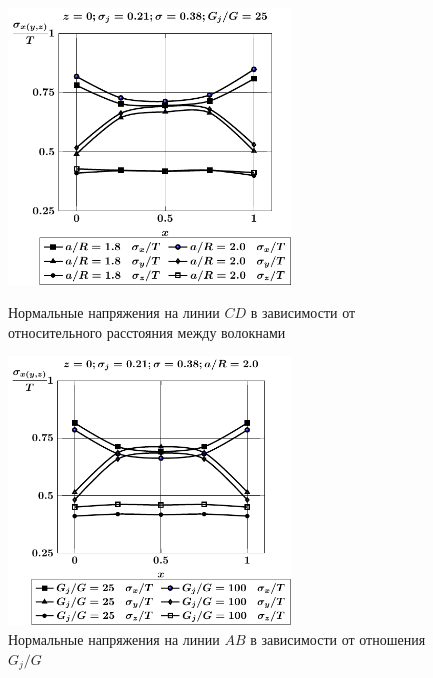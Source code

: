 \begin{figure}[h!]
\centering\footnotesize
\parbox[b]{7.5cm}{\centering\includegraphics[width=7.5cm]{inc25-a-h10-r10-g25-z0-cd.pdf}
\caption{Нормальные напряжения на линии $CD$ в зависимости от относительного расстояния между волокнами
\label{f:7:155}}}\hfil\hfil
\parbox[b]{7.5cm}{\centering\includegraphics[width=7.5cm]{inc25-g-a20-h10-r10-z0-ab.pdf}
\caption{Нормальные напряжения на линии $AB$ в зависимости от отношения $G_j/G$ 
\label{f:7:156}}}
\end{figure}


